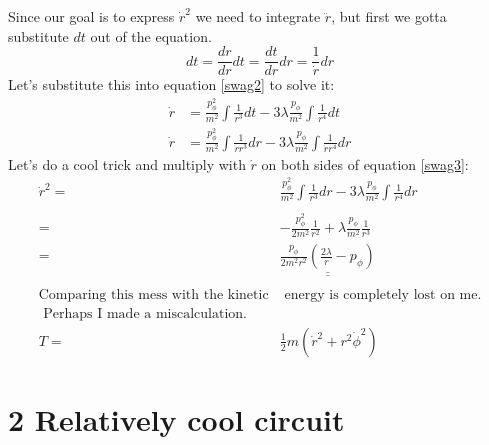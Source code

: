 \documentclass{report}
\begin{document}
Since our goal is to express $\dot r ^2$ we need to integrate $\ddot r$, but first we gotta substitute $dt$ out of the equation.
$$dt = \frac{dr}{dr} dt = \frac{dt}{dr} dr = \frac{1}{\dot r} dr$$
Let\rq{}s substitute this into equation \ref{swag2} to solve it:
\begin{align}
 \dot r &= \frac{p_\phi^2}{m^2} \int \frac{1}{r^3}dt   - 3\lambda\frac{p_\phi}{m^2}\int \frac{1}{r^4} dt  \nonumber\\
 \dot r &= \frac{p_\phi^2}{m^2} \int \frac{1}{\dot r r^3}dr   - 3\lambda\frac{p_\phi}{m^2}\int \frac{1}{\dot r r^4} dr  \label{swag3}
\end{align}
Let\rq{}s do a cool trick and multiply with $\dot r$  on both sides of  equation \ref{swag3}:
\begin{align}
 \dot r^2 =& \frac{p_\phi^2}{m^2} \int \frac{1}{ r^3}dr   - 3\lambda\frac{p_\phi}{m^2}\int \frac{1}{ r^4} dr  \nonumber\\
\nonumber\\
 =& -\frac{p_\phi^2}{2m^2}  \frac{1}{ r^2}   + \lambda\frac{p_\phi}{m^2} \frac{1}{ r^3}   \\
=& \underline{\underline{\frac{p_\phi}{2m^2r^2}( \frac{2\lambda}{r} -  p_\phi) }}\\
\nonumber\\
\text{Comparing this mess with the kinetic}&\text{ energy is completely lost on me.}\nonumber\\ 
\text{ Perhaps I made a miscalculation.}\nonumber \ \ \ \ \   \ \ &\\ 
T =& \frac{1}{2}m(\dot r^2 + r^2\dot\phi^2)
\end{align}
\clearpage
\section*{2 Relatively cool circuit}
\end{document}
